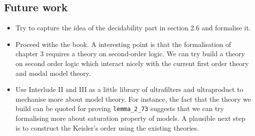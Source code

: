 \documentclass[letterpaper]{article}
\begin{document}
\subsection{Future work}

\begin{itemize}
\item Try to capture the idea of the decidability part in section 2.6 and formalise it.

\item Proceed withe the book. A interesting point is that the formalisation of chapter 3 requires a theory on second-order logic. We can try build a theory on second order logic which interact nicely with the current first order theory and modal model theory. 

\item Use Interlude II and III as a little library of ultrafilters and ultraproduct to mechanise more about model theory. For instance, the fact that the theory we build can be quoted for proving \texttt{lemma_2_73} suggests that we can try formalising more about saturation property of models. A plausible next step is to construct the Keisler's order using the existing theories.

\end{itemize}



\begin{figure}[htbp]

\end{figure}
\end{document}
